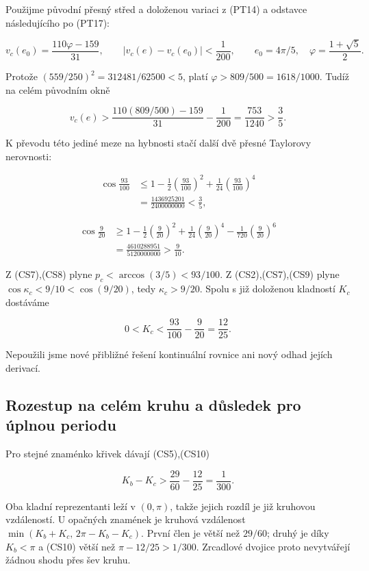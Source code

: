 \documentclass[11pt,a4paper]{article}
\theoremstyle{remark}\newtheorem{remark}[theorem]{Poznámka}
\numberwithin{equation}{section}
\begin{document}
Použijme původní přesný střed a doloženou variaci z (PT14) a odstavce
následujícího po (PT17):

\[
v_c(e_0)=\frac{110\varphi-159}{31},\qquad
|v_c(e)-v_c(e_0)|<\frac1{200},\qquad
e_0=4\pi/5,\quad \varphi=\frac{1+\sqrt5}{2}.
\tag{CS6}
\]

Protože \((559/250)^2=312481/62500<5\), platí
\(\varphi>809/500=1618/1000\). Tudíž na celém původním okně

\[
v_c(e)>
\frac{110(809/500)-159}{31}-\frac1{200}
=\frac{753}{1240}>\frac35.
\tag{CS7}
\]

K převodu této jediné meze na hybnosti stačí další dvě přesné Taylorovy
nerovnosti:

\[
\begin{aligned}
\cos\frac{93}{100}
&\le1-\frac12\left(\frac{93}{100}\right)^2
+\frac1{24}\left(\frac{93}{100}\right)^4\\
&=\frac{1436925201}{2400000000}<\frac35,
\end{aligned}
\tag{CS8}
\]

\[
\begin{aligned}
\cos\frac9{20}
&\ge1-\frac12\left(\frac9{20}\right)^2
+\frac1{24}\left(\frac9{20}\right)^4
-\frac1{720}\left(\frac9{20}\right)^6\\
&=\frac{4610288951}{5120000000}>\frac9{10}.
\end{aligned}
\tag{CS9}
\]

Z (CS7),(CS8) plyne \(p_c<\arccos(3/5)<93/100\). Z (CS2),(CS7),(CS9)
plyne \(\cos\kappa_c<9/10<\cos(9/20)\), tedy \(\kappa_c>9/20\). Spolu s
již doloženou kladností \(K_c\) dostáváme

\[
\boxed{0<K_c<\frac{93}{100}-\frac9{20}=\frac{12}{25}.}
\tag{CS10}
\]

Nepoužili jsme nové přibližné řešení kontinuální rovnice ani nový odhad
jejích derivací.

\hypertarget{rozestup-na-celuxe9m-kruhu-a-dux16fsledek-pro-uxfaplnou-periodu}{%
\subsection{Rozestup na celém kruhu a důsledek pro úplnou
periodu}\label{rozestup-na-celuxe9m-kruhu-a-dux16fsledek-pro-uxfaplnou-periodu}}

Pro stejné znaménko křivek dávají (CS5),(CS10)

\[
\boxed{K_b-K_c>\frac{29}{60}-\frac{12}{25}=\frac1{300}.}
\tag{CS11}
\]

Oba kladní reprezentanti leží v \((0,\pi)\), takže jejich rozdíl je již
kruhovou vzdáleností. U opačných znamének je kruhová vzdálenost
\(\min(K_b+K_c,\,2\pi-K_b-K_c)\). První člen je větší než \(29/60\);
druhý je díky \(K_b<\pi\) a (CS10) větší než \(\pi-12/25>1/300\).
Zrcadlové dvojice proto nevytvářejí žádnou shodu přes šev kruhu.
\end{document}
